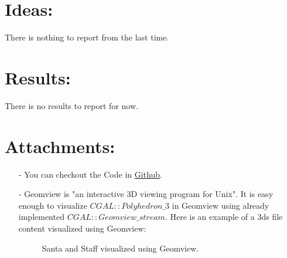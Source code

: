 \documentclass[a4paper, 11pt]{article}
\begin{document}
	\section*{Ideas:}
	There is nothing to report from the last time.
	
	\section*{Results:}
	There is no results to report for now.
	
	\section*{Attachments:}
	
	\begin{itemize}
		\item[-] You can checkout the Code in \href{https://github.com/Ethiy/3DSceneModel}{Github}.
		\item[-] Geomview is "an interactive 3D viewing program for Unix". It is easy enough to visualize $CGAL::Polyhedron\_3$ in Geomview using already implemented $CGAL::Geomview\_stream$. Here is an example of a 3ds file content visualized using Geomview:
		\begin{figure}[H]
			\caption{\label{img::geomview} Santa and Staff visualized using Geomview.}

\end{figure}
\end{itemize}
\end{document}
